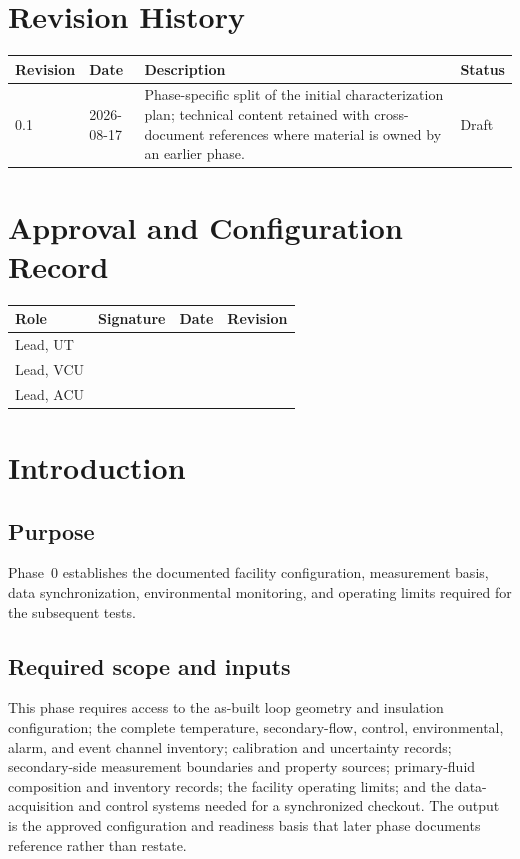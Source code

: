 \documentclass[11pt]{article}
\begin{document}
\clearpage
{}
\section*{Revision History}
\begin{tabularx}{\textwidth}{@{}p{0.75in}p{1.2in}>{\raggedright\arraybackslash}X>{\raggedright\arraybackslash}p{1.15in}@{}}
\toprule
\textbf{Revision} & \textbf{Date} & \textbf{Description} & \textbf{Status} \\
\midrule
0.1 & 2026-08-17 & Phase-specific split of the initial characterization plan; technical content retained with cross-document references where material is owned by an earlier phase. & Draft \\
\bottomrule
\end{tabularx}

\vspace{0.25in}
\section*{Approval and Configuration Record}
\begin{tabularx}{\textwidth}{@{}p{1.55in}X p{1.25in}p{1.05in}@{}}
\toprule
\textbf{Role} & \textbf{Signature} & \textbf{Date} & \textbf{Revision} \\
\midrule
Lead, UT & & & \\
Lead, VCU & & & \\
Lead, ACU & & & \\
\bottomrule
\end{tabularx}
\clearpage
\tableofcontents
\clearpage
{}

\section{Introduction}
\label{sec:introduction}
\subsection{Purpose}
Phase~0 establishes the documented facility configuration, measurement basis, data synchronization, environmental monitoring, and operating limits required for the subsequent tests.

\subsection{Required scope and inputs}
This phase requires access to the as-built loop geometry and insulation configuration; the complete temperature, secondary-flow, control, environmental, alarm, and event channel inventory; calibration and uncertainty records; secondary-side measurement boundaries and property sources; primary-fluid composition and inventory records; the facility operating limits; and the data-acquisition and control systems needed for a synchronized checkout. The output is the approved configuration and readiness basis that later phase documents reference rather than restate.
\end{document}
